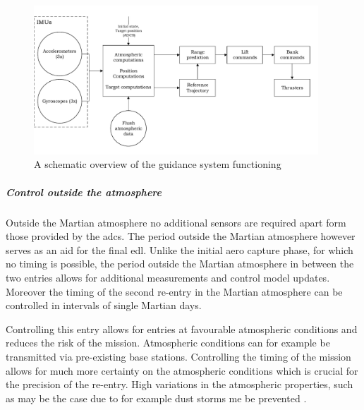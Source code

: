 \begin{figure}[h]
	\centering
	\includegraphics[width=0.95\textwidth]{./Figure/control/Contsys.pdf}
	\caption{A schematic overview of the guidance system functioning}
	\label{fig:Contsys}
\end{figure}

\subparagraph{Control outside the atmosphere}

Outside the Martian atmosphere no additional sensors are required apart form those provided by the \gls{adcs}. The period outside the Martian atmosphere however serves as an aid for the final \gls{edl}. Unlike the initial aero capture phase, for which no timing is possible, the period outside the Martian atmosphere in between the two entries allows for additional measurements and control model updates. Moreover the timing of the second re-entry in the Martian atmosphere can be controlled in intervals of single Martian days.

Controlling this entry allows for entries at favourable atmospheric conditions and reduces the risk of the mission. Atmospheric conditions can for example be transmitted via pre-existing base stations. Controlling the timing of the mission allows for much more certainty on the atmospheric conditions which is crucial for the precision of the re-entry. High variations in the atmospheric properties, such as may be the case due to for example dust storms me be prevented \cite{Justh2012}.


